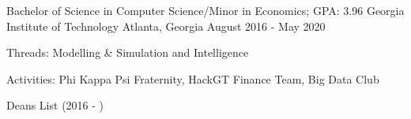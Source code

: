 \documentclass[
    changecolor={0, 38, 58},
]{pranav-resume}
\begin{document}
\pagestyle{empty} %


\cventry
  {Bachelor of Science in Computer Science/Minor in Economics; GPA: 3.96}
  {Georgia Institute of Technology}
  {Atlanta, Georgia}
  {August 2016 - May 2020}
  {
    \begin{cvitems}
      \item {Threads: Modelling \& Simulation and Intelligence}
      \item {Activities: Phi Kappa Psi Fraternity, HackGT Finance Team, Big Data Club}
      \item {Deans List (2016 - )}
    \end{cvitems}
  }
\end{document}
